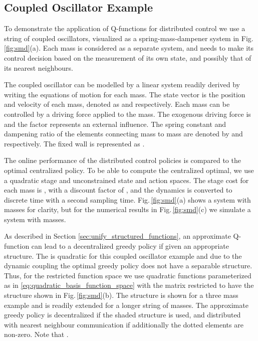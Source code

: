 \documentclass[journal]{IEEEtran}
\newcommand{\textQ}{Q}
\begin{document}
\subsection{Coupled Oscillator Example} \label{sec:numerical_smd}







To demonstrate the application of \textQ-functions for distributed control we use a string of coupled oscillators, visualized as a spring-mass-dampener system in Fig.\,\ref{fig:smd}(a). Each mass is considered as a separate system, and needs to make its control decision based on the measurement of its own state, and possibly that of its nearest neighbours.



The coupled oscillator can be modelled by a linear system readily derived by writing the equations of motion for each mass. The state vector is the position and velocity of each mass, denoted as  and  respectively. Each mass can be controlled by a driving force  applied to the mass. The exogenous driving force is  and the factor  represents an external influence. The spring constant and dampening ratio of the elements connecting mass  to mass  are denoted by  and  respectively. The fixed wall is represented as .


The online performance of the distributed control policies is compared to the optimal centralized policy. To be able to compute the centralized optimal, we use a quadratic stage and unconstrained state and action spaces. The stage cost for each mass is , with a discount factor of , and the dynamics is converted to discrete time with a  second sampling time. 
Fig.\,\ref{fig:smd}(a) shows a system with  masses for clarity, but for the numerical results in Fig.\,\ref{fig:smd}(c) we simulate a system with  masses.


As described in Section \ref{sec:unify_structured_functions}, an approximate \textQ-function can lead to a decentralized greedy policy if given an appropriate structure. The  is quadratic for this coupled oscillator example and due to the dynamic coupling the optimal greedy policy does not have a separable structure. Thus, for the restricted function space  we use quadratic functions parameterized as in \eqref{eq:quadratic_basis_function_space} with the  matrix restricted to have the structure shown in Fig.\,\ref{fig:smd}(b). The structure is shown for a three mass example and is readily extended for a longer string of masses. The approximate greedy policy is decentralized if the shaded structure is used, and distributed with nearest neighbour communication if additionally the dotted elements are non-zero. Note that .
\end{document}
